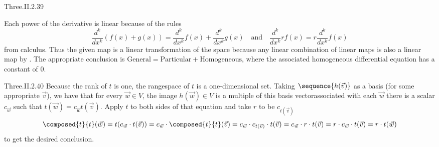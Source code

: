 \begin{ans}{Three.II.2.39}
\begin{exparts}
        \partsitem Each power of the derivative is
          linear because of the rules
          \begin{equation*}
            \frac{d^k}{dx^k}(f(x)+g(x))=\frac{d^k}{dx^k}f(x)
                                         +\frac{d^k}{dx^k}g(x)
            \quad\text{and}\quad
            \frac{d^k}{dx^k}rf(x)=r\frac{d^k}{dx^k}f(x)
          \end{equation*}
          from calculus.
          Thus the given map is a linear transformation of the space because
          any linear combination of linear maps is also a linear map
          by .
          The appropriate conclusion is
          \( \text{General}=\text{Particular}+\text{Homogeneous} \),
          where the associated homogeneous differential
          equation has a constant of \( 0 \).
      \end{exparts}
     
\end{ans}
\begin{ans}{Three.II.2.40}
      Because the rank of \( t \) is one, the rangespace of \( t \)
      is a one-dimensional set.
      Taking $\sequence{h(\vec{v})}$ as a basis (for some appropriate
      $\vec{v}$), we have that for every $\vec{w}\in V$, the image
      $h(\vec{w})\in V$ is a multiple of this basis vector\Dash associated
      with each $\vec{w}$ there is a scalar
      \( c_{\vec{w}} \)
      such that \( t(\vec{w})=c_{\vec{w}}t(\vec{v}) \).
      Apply \( t \) to both sides of that equation
      and take \( r \) to be \( c_{t(\vec{v})} \)
      \begin{equation*}
        \composed{t}{t}(\vec{w})
        =t(c_{\vec{w}}\cdot t(\vec{v}))
        =c_{\vec{w}}\cdot\composed{t}{t}(\vec{v})
        =c_{\vec{w}}\cdot c_{t(\vec{v})}\cdot t(\vec{v})
        =c_{\vec{w}}\cdot r\cdot t(\vec{v})
        =r\cdot c_{\vec{w}}\cdot t(\vec{v})
        =r\cdot t(\vec{w})
      \end{equation*}
      to get the desired conclusion.
    
\end{ans}
